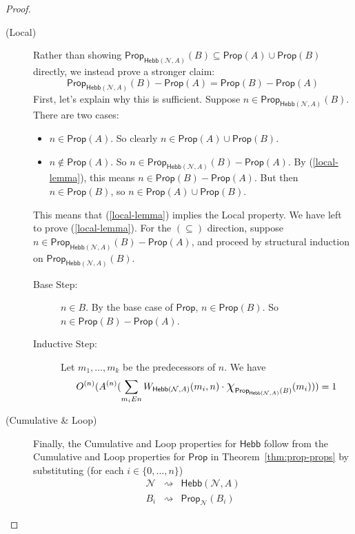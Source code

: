 \documentclass[letterpaper]{article}
\theoremstyle{definition}
\newcommand{\set}[1]{\{ #1 \}}
\newcommand*{\bigchi}{\mbox{\Large$\chi$}}%
\newcommand{\Prop}{\textsf{Prop}}
\newcommand{\Inc}{\textsf{Hebb}}
\newcommand{\Net}{\mathcal{N}}
\begin{document}
\begin{proof}
\begin{description}
    \item[(Local)]
    Rather than showing $\Prop_{\Inc(\Net, A)}(B) \subseteq \Prop(A) \cup \Prop(B)$ directly, we instead prove a stronger claim:
    \begin{equation}\tag{$\ast\ast\ast$}
    \label{local-lemma}
        \Prop_{\Inc(\Net, A)}(B) - \Prop(A) = \Prop(B) - \Prop(A)
    \end{equation}
    First, let's explain why this is sufficient. Suppose $n \in \Prop_{\Inc(\Net, A)}(B)$. There are two cases:
    \begin{itemize}
        \item $n \in \Prop(A)$. So clearly $n \in \Prop(A) \cup \Prop(B)$.
        \item $n \not \in \Prop(A)$. So $n \in \Prop_{\Inc(\Net, A)}(B) - \Prop(A)$. By (\ref{local-lemma}), this means $n \in \Prop(B) - \Prop(A)$. But then $n \in \Prop(B)$, so $n\in \Prop(A) \cup \Prop(B)$.
    \end{itemize}
    This means that (\ref{local-lemma}) implies the Local property. We have left to prove (\ref{local-lemma}). For the $(\subseteq)$ direction, suppose $n \in \Prop_{\Inc(\Net, A)}(B) - \Prop(A)$, and proceed by structural induction on $\Prop_{\Inc(\Net, A)}(B)$.
    \begin{description}
        \item[Base Step:] $n \in B$. By the base case of $\Prop$, $n \in \Prop(B)$. So $n \in \Prop(B) - \Prop(A)$.

        \item[Inductive Step:] Let $m_1, \ldots, m_k$ be the predecessors of $n$. We have
        \[
            O^{(n)}(A^{(n)}(\sum_{m_i{E}n} W_{\Inc(\Net, A)}(m_i, n) \cdot \bigchi_{\Prop_{\Inc(\Net, A)}(B)}(m_i))) = 1
        \]
        
    \end{description}

    
    \item[(Cumulative \& Loop)] Finally, the Cumulative and Loop properties for $\Inc$ follow from the Cumulative and Loop properties for $\Prop$ in Theorem~\ref{thm:prop-props} by substituting (for each $i \in \set{0, \ldots, n}$)
    \[
    \begin{array}{lcl}
    
    \Net & \rightsquigarrow & \Inc(\Net, A)\\
    B_i & \rightsquigarrow & \Prop_\Net(B_i)
    
    \end{array}
    \]
\end{description}
\end{proof}
\end{document}
